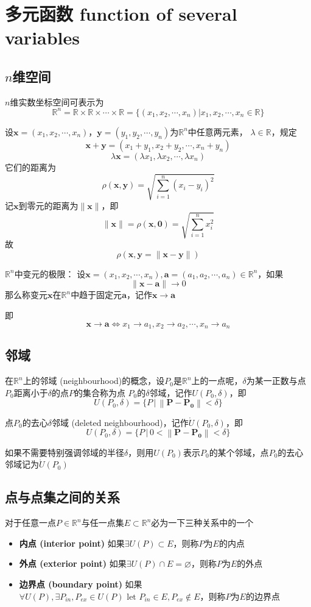 \documentclass[UTF8]{ctexart}
\newcommand{\ve}[1]{{\bm{#1}}}
\newcommand{\dist}[2]{{\left\|\ve{#1}-\ve{#2}\right\|}}
\begin{document}
\section*{多元函数 function of several variables}

\subsection*{$n$维空间}
$n$维实数坐标空间可表示为
\[\mathbb{R}^n=\mathbb{R}\times\mathbb{R}\times\cdots\times\mathbb{R}=\{(x_1,x_2,\cdots,x_n)|x_1,x_2,\cdots,x_n\in\mathbb{R}\}\]

设$\ve{x}=(x_1,x_2,\cdots,x_n)$，$\ve{y}=(y_1,y_2,\cdots,y_n)$为$\mathbb{R}^n$中任意两元素，
$\lambda\in\mathbb{R}$，规定
\[\ve{x}+\ve{y}=(x_1+y_1,x_2+y_2,\cdots,x_n+y_n)\]
\[\lambda\ve{x}=(\lambda x_1,\lambda x_2,\cdots,\lambda x_n)\]
它们的距离为
\[\rho(\ve{x},\ve{y})=\sqrt{\sum^n_{i=1}(x_i-y_i)^2}\]
记$\ve{x}$到零元的距离为$\|\ve{x}\|$，即
\[\|\ve{x}\|=\rho(\ve{x},\ve{0})=\sqrt{\sum^n_{i=1}x_i^2}\]
故
\[\rho(\ve{x},\ve{y}=\|\ve{x}-\ve{y}\|)\]

$\mathbb{R}^n$中变元的极限：
设$\ve{x}=(x_1,x_2,\cdots,x_n),\ve{a}=(a_1,a_2,\cdots,a_n)\in\mathbb{R}^n$，如果
\[\dist{x}{a}\to0\]
那么称变元$\ve{x}$在$\mathbb{R}^n$中趋于固定元$\ve{a}$，记作$\ve{x}\to\ve{a}$

即
\[\ve{x}\to\ve{a} \Leftrightarrow x_1\to a_1,x_2\to a_2,\cdots,x_n\to a_n\]

\subsection*{邻域}

在$\mathbb{R}^n$上的邻域 (neighbourhood)的概念，设$P_0$是$\mathbb{R}^n$上的一点呢，$\delta$为某一正数与点$P_0$距离小于$\delta$的点$P$的集合称为点
$P_0$的$\delta$邻域，记作$U(P_0,\delta)$，即
\[ U(P_0,\delta)=\{P\,|\,\dist{P}{P_0}<\delta\} \]

点$P_0$的去心$\delta$邻域 (deleted neighbourhood)，记作$\mathring{U}(P_0,\delta)$，即
\[ U(P_0,\delta)=\{P\,|\,0<\dist{P}{P_0}<\delta\} \]

如果不需要特别强调邻域的半径$\delta$，则用$U(P_0)$表示$P_0$的某个邻域，点$P_0$的去心邻域记为$\mathring{U}(P_0)$


\subsection*{点与点集之间的关系}

对于任意一点$P\in\mathbb{R}^n$与任一点集$E\subset\mathbb{R}^n$必为一下三种关系中的一个
\begin{itemize}
  \item {\bf 内点 (interior point)} 如果$\exists U(P)\subset E$，则称$P$为$E$的内点
  \item {\bf 外点 (exterior point)} 如果$\exists U(P)\cap E = \varnothing$，则称$P$为$E$的外点
  \item {\bf 边界点 (boundary point)} 如果$\forall U(P), \exists P_{in},P_{ex}\in U(P)\text{ let }P_{in}\in E,P_{ex}\notin E$，则称$P$为$E$的边界点
\end{itemize}
\end{document}
